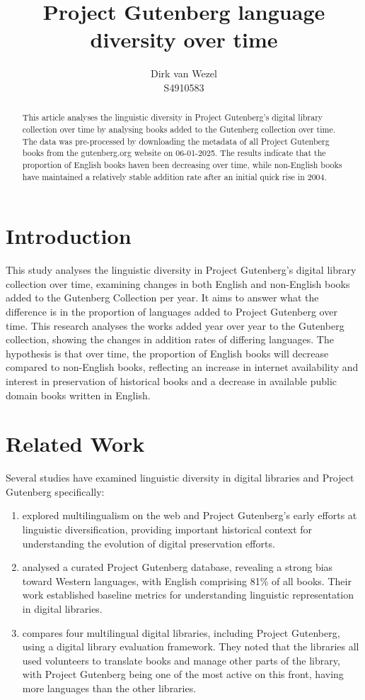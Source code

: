 \documentclass[11pt]{article}
\title{Project Gutenberg language diversity over time}
\author{Dirk van Wezel \\
S4910583 \\}
\date{}
\begin{document}
\maketitle

\begin{abstract}
This article analyses the linguistic diversity in Project Gutenberg's digital library collection over time by analysing books added to the Gutenberg collection over time. The data was pre-processed by downloading the metadata of all Project Gutenberg books from the gutenberg.org website on 06-01-2025. The results indicate that the proportion of English books haven been decreasing over time, while non-English books have maintained a relatively stable addition rate after an initial quick rise in 2004. 
\end{abstract}


\section{Introduction}
This study analyses the linguistic diversity in Project Gutenberg's digital library collection over time, examining changes in both English and non-English books added to the Gutenberg Collection per year. It aims to answer what the difference is in the proportion of languages added to Project Gutenberg over time. This research analyses the works added year over year to the Gutenberg collection, showing the changes in addition rates of differing languages. The hypothesis is that over time, the proportion of English books will decrease compared to non-English books, reflecting an increase in internet availability and interest in preservation of historical books and a decrease in available public domain books written in English. 
\section{Related Work}

Several studies have examined linguistic diversity in digital libraries and Project Gutenberg specifically:
\begin{enumerate}
    \item \textcite{whitt_diachronic_2018} explored multilingualism on the web and Project Gutenberg's early efforts at linguistic diversification, providing important historical context for understanding the evolution of digital preservation efforts.
    \item \textcite{gerlach_standardized_2020} analysed a curated Project Gutenberg database, revealing a strong bias toward Western languages, with English comprising 81\% of all books. Their work established baseline metrics for understanding linguistic representation in digital libraries.
    \item \textcite{budziseweaver_collaboration_2012} compares four multilingual digital libraries, including Project Gutenberg, using a digital library evaluation framework. They noted that the libraries all used volunteers to translate books and manage other parts of the library, with Project Gutenberg being one of the most active on this front, having more languages than the other libraries.
\end{enumerate}
\end{document}
